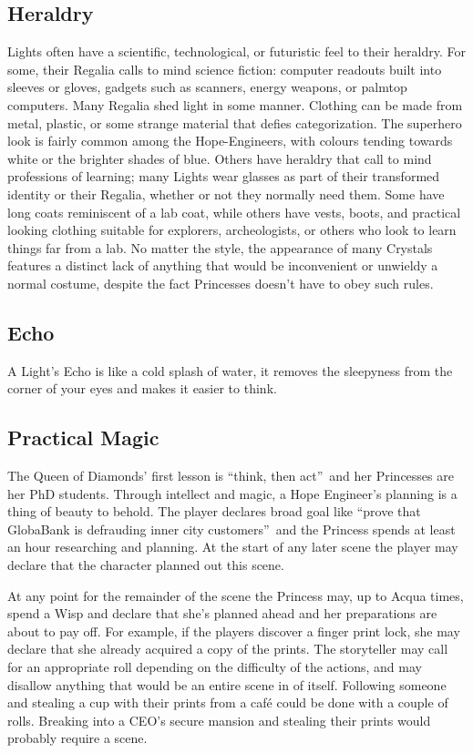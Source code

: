 \subsection*{Heraldry}
Lights often have a scientific, technological, or futuristic feel to their heraldry. For some, their Regalia calls to mind science fiction: computer readouts built into sleeves or gloves, gadgets such as scanners, energy weapons, or palmtop computers. Many Regalia shed light in some manner. Clothing can be made from metal, plastic, or some strange material that defies categorization. The superhero look is fairly common among the Hope-Engineers, with colours tending towards white or the brighter shades of blue. Others have heraldry that call to mind professions of learning; many Lights wear glasses as part of their transformed identity or their Regalia, whether or not they normally need them. Some have long coats reminiscent of a lab coat, while others have vests, boots, and practical looking clothing suitable for explorers, archeologists, or others who look to learn things far from a lab. No matter the style, the appearance of many Crystals features a distinct lack of anything that would be inconvenient or 
unwieldy a normal costume, despite the fact 
Princesses doesn't have to obey such rules.

\subsection*{Echo}
A Light's Echo is like a cold splash of water, it removes the sleepyness from the corner of your eyes and makes it easier to think.

\subsection*{Practical Magic}

The Queen of Diamonds' first lesson is \textquotedblleft think, then act\textquotedblright\, and her Princesses are her PhD students. Through intellect and magic, a Hope Engineer's planning is a thing of beauty to behold. The player declares broad goal like \textquotedblleft prove that GlobaBank is defrauding inner city customers\textquotedblright\, and the Princess spends at least an hour researching and planning. At the start of any later scene the player may declare that the character planned out this scene.

At any point for the remainder of the scene the Princess may, up to Acqua times, spend a Wisp and declare that she's planned ahead and her preparations are about to pay off. For example, if the players discover a finger print lock, she may declare that she already acquired a copy of the prints. The storyteller may call for an appropriate roll depending on the difficulty of the actions, and may disallow anything that would be an entire scene in of itself. Following someone and stealing a cup with their prints from a caf\'{e} could be done with a couple of rolls. Breaking into a CEO's secure mansion and stealing their prints would probably require a scene.

